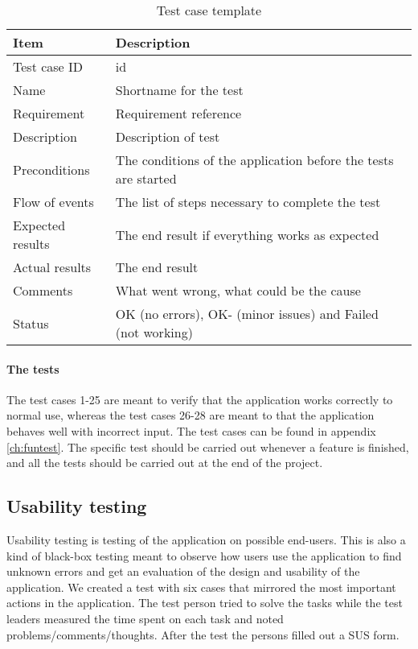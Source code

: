 \begin{table}[h!]
\begin{center}
\begin{tabular}{l|p{10cm}}\hline
\textbf{Item} & \textbf{Description} \\ \hline \hline
Test case ID & id \\ \hline
Name & Shortname for the test\\ \hline
Requirement & Requirement reference\\ \hline
Description & Description of test\\ \hline
Preconditions & The conditions of the application before the tests are started\\ \hline
Flow of events & The list of steps necessary to complete the test \\ \hline
Expected results & The end result if everything works as expected\\ \hline 
Actual results & The end result\\ \hline
Comments & What went wrong, what could be the cause\\ \hline
Status &OK (no errors), OK- (minor issues) and Failed (not working)\\ \hline
\end{tabular}
\end{center}
\caption{Test case template} \label{tab:casetemp1}
\end{table}

\paragraph{The tests}\hfill
\newline
The test cases 1-25 are meant to verify that the application works correctly to normal use, whereas the test cases 26-28 are meant to that the application behaves well with incorrect input. The test cases can be found in appendix \ref{ch:funtest}. The specific test should be carried out whenever a feature is finished, and all the tests should be carried out at the end of the project.
			
\subsection{Usability testing}\label{subsec:usabilitytesting}
Usability testing is testing of the application on possible end-users. This is also a kind of black-box testing meant to observe how users use the application to find unknown errors and get an evaluation of the design and usability of the application. We created a test with six cases that mirrored the most important actions in the application. The test person tried to solve the tasks while the test leaders measured the time spent on each task and noted problems/comments/thoughts. After the test the persons filled out a SUS form.


